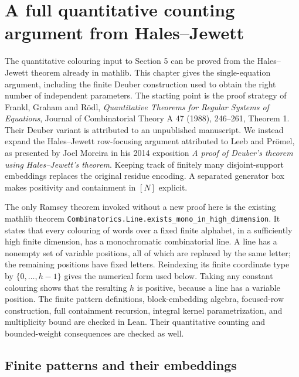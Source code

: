 \chapter{A full quantitative counting argument from Hales--Jewett}
\label{qr:chapter}

The quantitative colouring input to Section 5 can be proved from the
Hales--Jewett theorem already in mathlib.  This chapter gives the
single-equation argument, including the finite Deuber construction used
to obtain the right number of independent parameters.
The starting point is the proof strategy of Frankl, Graham and R\"odl,
\emph{Quantitative Theorems for Regular Systems of Equations}, Journal of
Combinatorial Theory A 47 (1988), 246--261, Theorem 1.  Their Deuber variant
is attributed to an unpublished manuscript.  We instead expand the
Hales--Jewett row-focusing argument attributed to Leeb and Pr\"omel, as
presented by Joel Moreira in his 2014 exposition
\emph{A proof of Deuber's theorem using Hales--Jewett's theorem}.
Keeping track of finitely many disjoint-support embeddings replaces the
original residue encoding.  A separated generator box makes positivity
and containment in $[N]$ explicit.

The only Ramsey theorem invoked without a new proof here is the existing
mathlib theorem
\texttt{Combinatorics.Line.exists\_mono\_in\_high\_dimension}.
It states that every colouring of words over a fixed finite alphabet, in
a sufficiently high finite dimension, has a monochromatic combinatorial
line.  A line has a nonempty set of variable positions, all of which are
replaced by the same letter; the remaining positions have fixed letters.
Reindexing its finite coordinate type by $\{0,\ldots,h-1\}$ gives the
numerical form used below.  Taking any constant colouring shows that
the resulting $h$ is positive, because a line has a variable position.
The finite pattern definitions, block-embedding algebra, focused-row
construction, full containment recursion, integral kernel parametrization,
and multiplicity bound are checked in Lean.  Their quantitative counting
and bounded-weight consequences are checked as well.

\section{Finite patterns and their embeddings}

